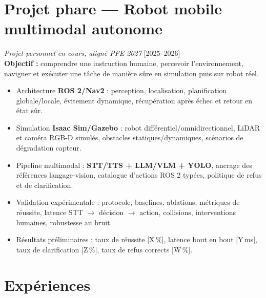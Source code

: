 \documentclass[11pt,a4paper]{article}
\begin{document}
\section{Projet phare — Robot mobile multimodal autonome}
\textit{Projet personnel en cours, aligné PFE 2027} \hfill [2025--2026]\\
\textbf{Objectif :} comprendre une instruction humaine, percevoir l'environnement, naviguer et exécuter une tâche de manière sûre en simulation puis sur robot réel.
\begin{itemize}[leftmargin=*, nosep]
    \item Architecture \textbf{ROS 2/Nav2} : perception, localisation, planification globale/locale, évitement dynamique, récupération après échec et retour en état sûr.
    \item Simulation \textbf{Isaac Sim/Gazebo} : robot différentiel/omnidirectionnel, LiDAR et caméra RGB-D simulés, obstacles statiques/dynamiques, scénarios de dégradation capteur.
    \item Pipeline multimodal : \textbf{STT/TTS + LLM/VLM + YOLO}, ancrage des références langage-vision, catalogue d'actions ROS 2 typées, politique de refus et de clarification.
    \item Validation expérimentale : protocole, baselines, ablations, métriques de réussite, latence STT $\rightarrow$ décision $\rightarrow$ action, collisions, interventions humaines, robustesse au bruit.
    \item Résultats préliminaires : taux de réussite [X\,\%], latence bout en bout [Y\,ms], taux de clarification [Z\,\%], taux de refus corrects [W\,\%].
\end{itemize}

\section{Expériences}
\end{document}

